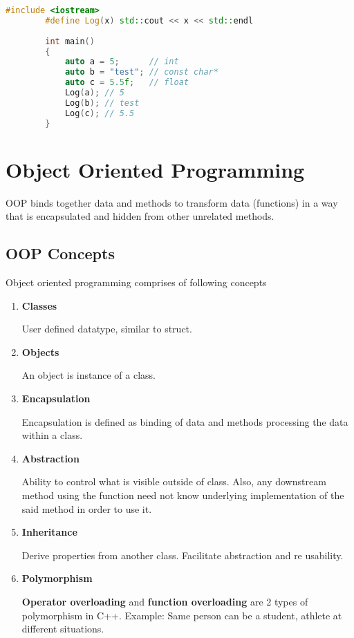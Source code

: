\documentclass{article}
\begin{document}
    \begin{lstlisting}[language=C++, caption=auto example]
        #include <iostream>
        #define Log(x) std::cout << x << std::endl
        
        int main()
        {
        	auto a = 5;		 // int
        	auto b = "test"; // const char*
        	auto c = 5.5f;	 // float
        	Log(a);	// 5
        	Log(b);	// test
        	Log(c);	// 5.5
        }
    \end{lstlisting}
    
    
\section{Object Oriented Programming}
    OOP binds together data and methods to transform data (functions) in a way that is encapsulated and hidden from other unrelated methods. 
    
    \subsection{OOP Concepts}
    Object oriented programming comprises of following concepts
    \begin{enumerate}
        \item \textbf{Classes}
        
        User defined datatype, similar to struct. 
        
        \item \textbf{Objects}
        
        An object is instance of a class.
        
        \item \textbf{Encapsulation}
        
        Encapsulation is defined as binding of data and methods processing the data within a class.
        
        \item \textbf{Abstraction}
        
        Ability to control what is visible outside of class. Also, any downstream method using the function need not know underlying implementation of the said method in order to use it. 
        
        \item \textbf{Inheritance}
        
        Derive properties from another class. Facilitate abstraction and re usability.
        
        \item \textbf{Polymorphism}
        
        \textbf{Operator overloading} and \textbf{function overloading} are 2 types of polymorphism in C++. Example: Same person can be a student, athlete at different situations. 
        
    \end{enumerate}
\end{document}
